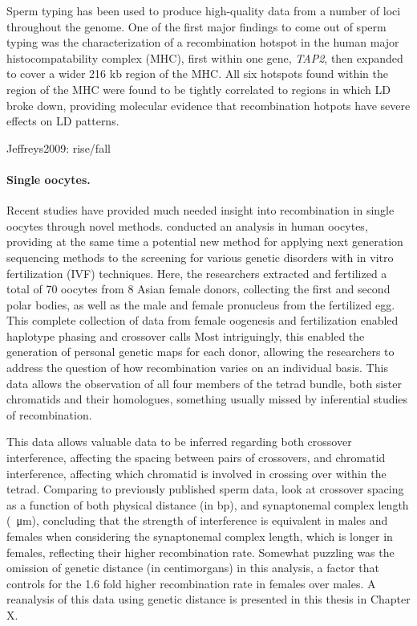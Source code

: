 Sperm typing has been used to produce high-quality data from a number of loci throughout the genome.
One of the first major findings to come out of sperm typing was the characterization of a recombination hotspot in the human major histocompatability complex (MHC), first within one gene, \textit{TAP2}\cite{Jeffreys2000}, then expanded to cover a wider 216 kb region of the MHC\cite{Jeffreys2001}.
All six hotspots found within the region of the MHC were found to be tightly correlated to regions in which LD broke down, providing molecular evidence that recombination hotpots have severe effects on LD patterns.


Jeffreys2009: rise/fall

\citet{Lu2012}
\citet{Wang2012}


\paragraph{Single oocytes.}
Recent studies have provided much needed insight into recombination in single oocytes through novel methods.
\citet{Hou2013} conducted an analysis in human oocytes, providing at the same time a potential new method for applying next generation sequencing methods to the screening for various genetic disorders with in vitro fertilization (IVF) techniques.
Here, the researchers extracted and fertilized a total of 70 oocytes from 8 Asian female donors, collecting the first and second polar bodies, as well as the male and female pronucleus from the fertilized egg.
This complete collection of data from female oogenesis and fertilization enabled haplotype phasing and crossover calls
Most intriguingly, this enabled the generation of personal genetic maps for each donor, allowing the researchers to address the question of how recombination varies on an individual basis.
This data allows the observation of all four members of the tetrad bundle, both sister chromatids and their homologues, something usually missed by inferential studies of recombination.

This data allows valuable data to be inferred regarding both crossover interference, affecting the spacing between pairs of crossovers, and chromatid interference, affecting which chromatid is involved in crossing over within the tetrad.
Comparing to previously published sperm data\cite{Lu2012}, \citet{Hou2013} look at crossover spacing as a function of both physical distance (in bp), and synaptonemal complex length (\SI{}{\micro\metre}), concluding that the strength of interference is equivalent in males and females when considering the synaptonemal complex length, which is longer in females, reflecting their higher recombination rate.
Somewhat puzzling was the omission of genetic distance (in centimorgans) in this analysis, a factor that controls for the 1.6 fold higher recombination rate in females over males.
A reanalysis of this data using genetic distance is presented in this thesis in Chapter X.

